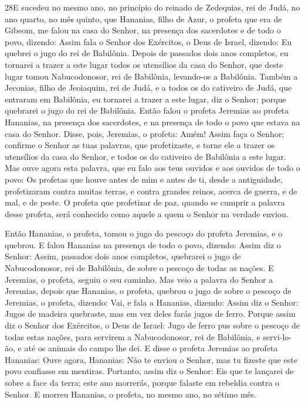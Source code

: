 \lettrine{28} E sucedeu no mesmo ano, no princípio do reinado
de Zedequias, rei de Judá, no ano quarto, no mês quinto, que
Hananias, filho de Azur, o profeta que era de Gibeom, me falou na
casa do Senhor, na presença dos sacerdotes e de todo o povo,
dizendo: Assim fala o Senhor dos Exércitos, o Deus de Israel,
dizendo: Eu quebrei o jugo do rei de Babilônia. Depois de
passados dois anos completos, eu tornarei a trazer a este lugar
todos os utensílios da casa do Senhor, que deste lugar tomou
Nabucodonosor, rei de Babilônia, levando-os a Babilônia. Também
a Jeconias, filho de Jeoiaquim, rei de Judá, e a todos os do
cativeiro de Judá, que entraram em Babilônia, eu tornarei a trazer a
este lugar, diz o Senhor; porque quebrarei o jugo do rei de
Babilônia. Então falou o profeta Jeremias ao profeta Hananias,
na presença dos sacerdotes, e na presença de todo o povo que estava
na casa do Senhor. Disse, pois, Jeremias, o profeta: Amém! Assim
faça o Senhor; confirme o Senhor as tuas palavras, que profetizaste,
e torne ele a trazer os utensílios da casa do Senhor, e todos os do
cativeiro de Babilônia a este lugar. Mas ouve agora esta
palavra, que eu falo aos teus ouvidos e aos ouvidos de todo o povo:
Os profetas que houve antes de mim e antes de ti, desde a
antiguidade, profetizaram contra muitas terras, e contra grandes
reinos, acerca de guerra, e de mal, e de peste. O profeta que
profetizar de paz, quando se cumprir a palavra desse profeta, será
conhecido como aquele a quem o Senhor na verdade enviou.

Então Hananias, o profeta, tomou o jugo do pescoço do profeta
Jeremias, e o quebrou. E falou Hananias na presença de todo o
povo, dizendo: Assim diz o Senhor: Assim, passados dois anos
completos, quebrarei o jugo de Nabucodonosor, rei de Babilônia, de
sobre o pescoço de todas as nações. E Jeremias, o profeta, seguiu o
seu caminho. Mas veio a palavra do Senhor a Jeremias, depois
que Hananias, o profeta, quebrou o jugo de sobre o pescoço de
Jeremias, o profeta, dizendo: Vai, e fala a Hananias,
dizendo: Assim diz o Senhor: Jugos de madeira quebraste, mas em vez
deles farás jugos de ferro. Porque assim diz o Senhor dos
Exércitos, o Deus de Israel: Jugo de ferro pus sobre o pescoço de
todas estas nações, para servirem a Nabucodonosor, rei de Babilônia,
e servi-lo-ão, e até os animais do campo lhe dei. E disse o
profeta Jeremias ao profeta Hananias: Ouve agora, Hananias: Não te
enviou o Senhor, mas tu fizeste que este povo confiasse em mentiras.
Portanto, assim diz o Senhor: Eis que te lançarei de sobre a
face da terra; este ano morrerás, porque falaste em rebeldia contra
o Senhor. E morreu Hananias, o profeta, no mesmo ano, no
sétimo mês.


